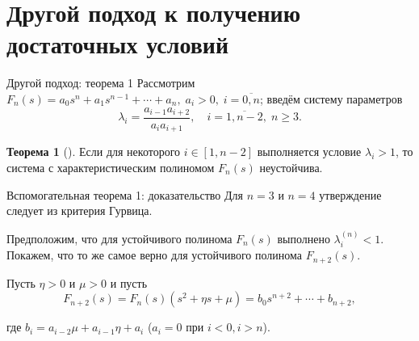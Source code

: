 \documentclass[notheorems,aspectratio=169]{beamer}
\theoremstyle{definition}
\newtheorem{theorem}{Теорема}
\begin{document}
\section{Другой подход к получению достаточных условий}

\begin{frame}{Другой подход: теорема 1}
  Рассмотрим $F_n(s) = a_0s^n + a_1s^{n-1} + \cdots + a_n,\;a_i > 0, \; i=\overline{0,n}$; введём систему параметров
  \begin{equation*}
    \lambda_i = \frac{a_{i-1}a_{i+2}}{a_i a_{i+1}}, \quad i=\overline{1,n-2}, \; n \geqslant 3.
  \end{equation*}

  \begin{theorem}[\cite{LipatovSokolov1978}]\label{th:helper_1}
    Если для некоторого $i \in [1, n-2]$ выполняется условие $\lambda_i > 1$, то система с характеристическим полиномом $F_n(s)$ неустойчива.
  \end{theorem}
\end{frame}

\begin{frame}{Вспомогательная теорема 1: доказательство}
  Для $n=3$ и $n=4$ утверждение следует из критерия Гурвица. \newline

  Предположим, что для устойчивого полинома $F_n(s)$ выполнено $\lambda_i^{(n)} < 1$.
  Покажем, что то же самое верно для устойчивого полинома $F_{n+2}(s)$. \newline

  Пусть $\eta > 0$ и $\mu > 0$ и пусть
  \begin{equation*}
    F_{n+2}(s) = F_n(s) (s^2 + \eta s + \mu) = b_0 s^{n+2} + \cdots + b_{n+2},
  \end{equation*}

  где $b_i = a_{i-2} \mu + a_{i-1} \eta + a_i$ ($a_i = 0$ при $i < 0, i > n$).
\end{frame}
\end{document}
